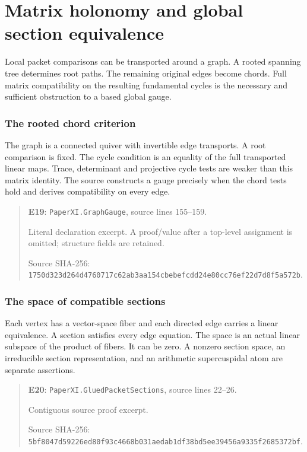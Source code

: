 \documentclass[10pt,oneside]{book}
\begin{document}
\chapter{Matrix holonomy and global section equivalence}
Local packet comparisons can be transported around a graph. A rooted spanning tree determines root paths. The remaining original edges become chords. Full matrix compatibility on the resulting fundamental cycles is the necessary and sufficient obstruction to a based global gauge.

\subsection{The rooted chord criterion}
\label{guide:E19}
The graph is a connected quiver with invertible edge transports. A root comparison is fixed. The cycle condition is an equality of the full transported linear maps.
Trace, determinant and projective cycle tests are weaker than this matrix identity. The source constructs a gauge precisely when the chord tests hold and derives compatibility on every edge.

\begin{quote}\footnotesize\textbf{E19}: \nolinkurl{PaperXI.GraphGauge}, source lines 155--159.\par Literal declaration excerpt. A proof/value after a top-level assignment is omitted; structure fields are retained.\par Source SHA-256: {\scriptsize\texttt{1750d323d264d4760717c62ab3aa154cbebefcdd24e80cc76ef22d7d8f5a572b}}.\end{quote}


\subsection{The space of compatible sections}
\label{guide:E20}
Each vertex has a vector-space fiber and each directed edge carries a linear equivalence. A section satisfies every edge equation.
The space is an actual linear subspace of the product of fibers. It can be zero. A nonzero section space, an irreducible section representation, and an arithmetic supercuspidal atom are separate assertions.

\begin{quote}\footnotesize\textbf{E20}: \nolinkurl{PaperXI.GluedPacketSections}, source lines 22--26.\par Contiguous source proof excerpt.\par Source SHA-256: {\scriptsize\texttt{5bf8047d59226ed80f93c4668b031aedab1df38bd5ee39456a9335f2685372bf}}.\end{quote}
\end{document}
